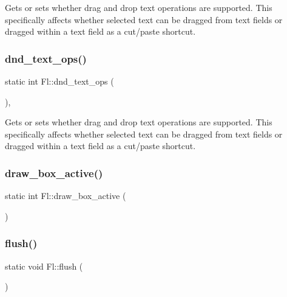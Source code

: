 Gets or sets whether drag and drop text operations are supported. This specifically affects whether selected text can be dragged from text fields or dragged within a text field as a cut/paste shortcut. \mbox{\label{class_fl_aae157def51e4dabe5f75298b676ddea2}} 
\subsubsection{\texorpdfstring{dnd\+\_\+text\+\_\+ops()}{dnd\_text\_ops()}\hspace{0.1cm}{\footnotesize\ttfamily [2/2]}}
{\footnotesize\ttfamily static int Fl\+::dnd\+\_\+text\+\_\+ops (\begin{DoxyParamCaption}{ }\end{DoxyParamCaption})\hspace{0.3cm}{\ttfamily [inline]}, {\ttfamily [static]}}

Gets or sets whether drag and drop text operations are supported. This specifically affects whether selected text can be dragged from text fields or dragged within a text field as a cut/paste shortcut. \mbox{\label{class_fl_a5c4abc49c9c47ec883957d38041da30e}} 
\subsubsection{\texorpdfstring{draw\+\_\+box\+\_\+active()}{draw\_box\_active()}}
{\footnotesize\ttfamily static int Fl\+::draw\+\_\+box\+\_\+active (\begin{DoxyParamCaption}{ }\end{DoxyParamCaption})\hspace{0.3cm}{\ttfamily [static]}}

\mbox{\label{class_fl_a0c4992c95528e8bc79ae258e75c0fcd7}} 
\subsubsection{\texorpdfstring{flush()}{flush()}}
{\footnotesize\ttfamily static void Fl\+::flush (\begin{DoxyParamCaption}{ }\end{DoxyParamCaption})\hspace{0.3cm}{\ttfamily [static]}}

